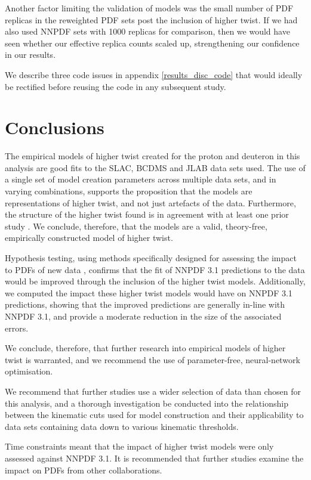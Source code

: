 \documentclass[12pt,a4paper]{report}
\begin{document}
Another factor limiting the validation of models was the small number of PDF replicas in the reweighted PDF sets post the inclusion of higher twist. If we had also used NNPDF sets with 1000 replicas for comparison, then we would have seen whether our effective replica counts scaled up, strengthening our confidence in our results.

We describe three code issues in appendix \ref{results_disc_code} that would ideally be rectified before reusing the code in any subsequent study.

\chapter{Conclusions} \label{ch:conclusions}

The empirical models of higher twist created for the proton and deuteron in this analysis are good fits to the SLAC, BCDMS and JLAB data sets used. The use of a single set of model creation parameters across multiple data sets, and in varying combinations, supports the proposition that the models are representations of higher twist, and not just artefacts of the data. Furthermore, the structure of the higher twist found is in agreement with at least one prior study \cite{Virchaux}. We conclude, therefore, that the models are a valid, theory-free, empirically constructed model of higher twist.

Hypothesis testing, using methods specifically designed for assessing the impact to PDFs of new data \cite{NNPDF:Reweight1} \cite{NNPDF:Reweight2}, confirms that the fit of NNPDF 3.1 predictions to the data would be improved through the inclusion of the higher twist models. Additionally, we computed the impact these higher twist models would have on NNPDF 3.1 predictions, showing that the improved predictions are generally in-line with NNPDF 3.1, and provide a moderate reduction in the size of the associated errors.

We conclude, therefore, that further research into empirical models of higher twist is warranted, and we recommend the use of parameter-free, neural-network optimisation.

We recommend that further studies use a wider selection of data than chosen for this analysis, and a thorough investigation be conducted into the relationship between the kinematic cuts used for model construction and their applicability to data sets containing data down to various kinematic thresholds.

Time constraints meant that the impact of higher twist models were only assessed against NNPDF 3.1. It is recommended that further studies examine the impact on PDFs from other collaborations.
\end{document}
